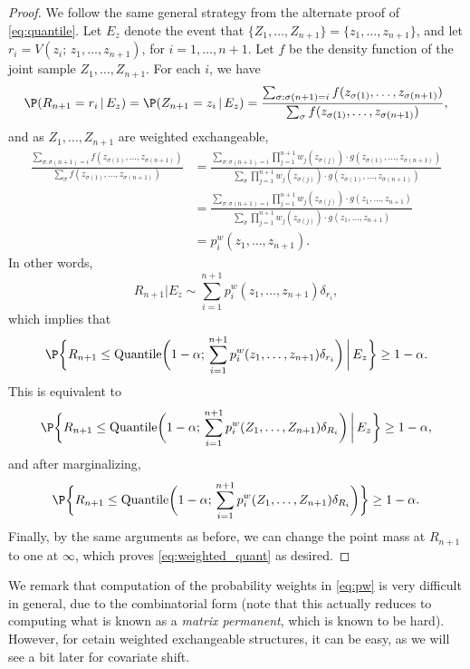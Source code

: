 \documentclass{article}
\begin{document}
\begin{proof}
We follow the same general strategy from the alternate proof of
\eqref{eq:quantile}. Let $E_z$ denote the event that
$\{Z_1,\dots,Z_{n+1}\}=\{z_1,\dots,z_{n+1}\}$, and let $r_i=V(z_i; \,
z_1,\dots,z_{n+1})$, for $i=1,\dots,n+1$. Let $f$ be the density function 
of the joint sample $Z_1,\dots,Z_{n+1}$. For each $i$, we have
\begin{equation}
\label{eq:general_calc}
\P(R_{n+1} = r_i \,|\, E_z) = \P(Z_{n+1} = z_i \,|\, E_z)
= \frac{\sum_{\sigma : \sigma(n+1)=i} f(z_{\sigma(1)},\dots, z_{\sigma(n+1)})} 
{\sum_\sigma f(z_{\sigma(1)},\dots, z_{\sigma(n+1)})},
\end{equation}
and as $Z_1,\dots,Z_{n+1}$ are weighted exchangeable,
\begin{align*}
\frac{\sum_{\sigma : \sigma(n+1)=i} f(z_{\sigma(1)},\dots, z_{\sigma(n+1)})}  
{\sum_\sigma f(z_{\sigma(1)},\dots, z_{\sigma(n+1)})} &= 
\frac{\sum_{\sigma : \sigma(n+1)=i} \prod_{j=1}^{n+1} w_j(z_{\sigma(j)}) \cdot 
  g(z_{\sigma(1)},\dots,z_{\sigma(n+1)})}
{\sum_\sigma \prod_{j=1}^{n+1} w_j(z_{\sigma(j)}) \cdot
  g(z_{\sigma(1)},\dots,z_{\sigma(n+1)})}  \\
&= \frac{\sum_{\sigma : \sigma(n+1)=i} \prod_{j=1}^{n+1} w_j(z_{\sigma(j)})
  \cdot g(z_1,\dots,z_{n+1})} 
{\sum_\sigma\prod_{j=1}^{n+1} w_j(z_{\sigma(j)}) \cdot g(z_1,\dots,z_{n+1})} \\ 
&= p^w_i(z_1,\dots,z_{n+1}).
\end{align*}
In other words,  
\[
R_{n+1}|E_z \sim \sum_{i=1}^{n+1} p^w_i(z_1,\dots,z_{n+1})\delta_{r_i},
\]
which implies that
\[
\P\bigg\{ R_{n+1} \leq \Quantile\bigg( 1-\alpha; \, \sum_{i=1}^{n+1}
p^w_i(z_1,\dots,z_{n+1})\delta_{r_i}\bigg) \, \bigg| \, E_z\bigg\} \geq
1-\alpha.  
\]
This is equivalent to  
\[
\P\bigg\{ R_{n+1} \leq \Quantile\bigg( 1-\alpha; \, \sum_{i=1}^{n+1} 
p^w_i(Z_1,\dots,Z_{n+1}) \delta_{R_i}\bigg) \, \bigg| \, E_z\bigg\} \geq
1-\alpha,  
\]
and after marginalizing, 
\[
\P\bigg\{ R_{n+1} \leq \Quantile\bigg( 1-\alpha; \, \sum_{i=1}^{n+1} 
p^w_i(Z_1,\dots,Z_{n+1}) \delta_{R_i}\bigg) \bigg\} \geq 1-\alpha. 
\]
Finally, by the same arguments as before, we can change the point mass at 
$R_{n+1}$ to one at $\infty$, which proves \eqref{eq:weighted_quant} as
desired. 
\end{proof}

We remark that computation of the probability weights in \eqref{eq:pw} is very
difficult in general, due to the combinatorial form (note that this actually
reduces to computing what is known as a \emph{matrix permanent}, which is known
to be hard). However, for cetain weighted exchangeable structures, it can be
easy, as we will see a bit later for covariate shift. 
\end{document}
